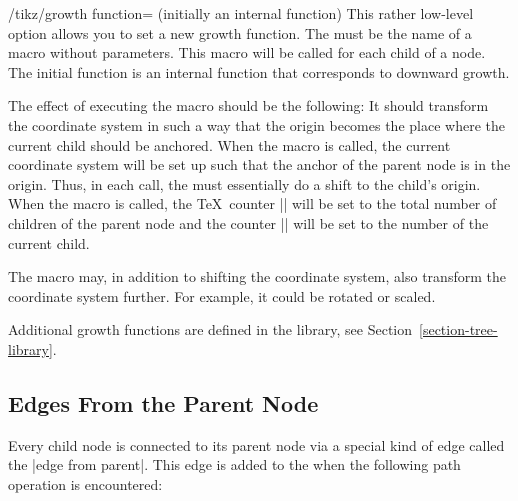 \begin{key}{/tikz/growth function= (initially \normalfont an internal function)}
    This rather low-level option allows you to set a new growth function. The
     must be the name of a macro without parameters. This
    macro will be called for each child of a node. The initial function is an
    internal function that corresponds to downward growth.

    The effect of executing the macro should be the following: It should
    transform the coordinate system in such a way that the origin becomes the
    place where the current child should be anchored. When the macro is called,
    the current coordinate system will be set up such that the anchor of the
    parent node is in the origin. Thus, in each call, the 
    must essentially do a shift to the child's origin. When the macro is
    called, the \TeX\ counter |\tikznumberofchildren| will be set to the total
    number of children of the parent node and the counter
    |\tikznumberofcurrentchild| will be set to the number of the current child.

    The macro may, in addition to shifting the coordinate system, also
    transform the coordinate system further. For example, it could be rotated
    or scaled.

    Additional growth functions are defined in the library, see
    Section~\ref{section-tree-library}.
\end{key}


\subsection{Edges From the Parent Node}
\label{section-edge-from-parent}

Every child node is connected to its parent node via a special kind of edge
called the |edge from parent|. This edge is added to the  when
the following path operation is encountered:

